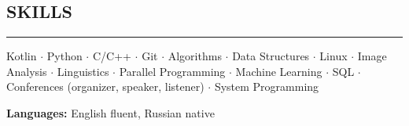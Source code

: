 \documentclass[11pt]{res} %
\let\orighref\href
\renewcommand{\href}[2]{\orighref{#1}{#2\,\faExternalLink}}
\begin{document}
\begin{resume}
\section{\uppercase{Skills}}
\begin{spacing}{0.3}
\textcolor[RGB]{220,220,220}{\rule{\linewidth}{0.4pt}} 
\end{spacing}
Kotlin $\cdot$ Python $\cdot$ C/C++ $\cdot$ Git $\cdot$ Algorithms $\cdot$ Data Structures $\cdot$ Linux $\cdot$ Image Analysis $\cdot$ Linguistics $\cdot$ Parallel Programming $\cdot$ Machine Learning $\cdot$ SQL $\cdot$ Conferences (organizer, speaker, listener) $\cdot$ System Programming


\textbf{Languages:} English fluent, Russian native

\end{resume}
\end{document}
